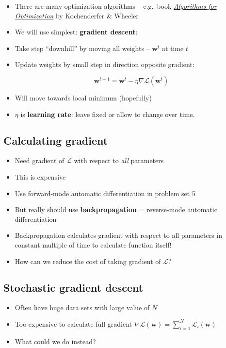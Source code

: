 \begin{itemize}
\item
  There are many optimization algorithms -- e.g.~book
  \href{https://mitpress.mit.edu/books/algorithms-optimization}{\emph{Algorithms
  for Optimization}} by Kochenderfer \& Wheeler
\item
  We will use simplest: \textbf{gradient descent}:
\item
  Take step ``downhill'' by moving all weights -- \(\mathbf{w}^t\) at
  time \(t\)
\item
  Update weights by small step in direction opposite gradient:

  \[\mathbf{w}^{t+1} = \mathbf{w}^{t} - \eta \nabla{\mathcal{L}}(\mathbf{w}^{t})\]
\item
  Will move towards local minimum (hopefully)
\item
  \(\eta\) is \textbf{learning rate}: leave fixed or allow to change
  over time.
\end{itemize}

\hypertarget{calculating-gradient}{%
\subsection{Calculating gradient}\label{calculating-gradient}}

\begin{itemize}
\item
  Need gradient of \(\mathcal{L}\) with respect to \emph{all} parameters
\item
  This is expensive
\item
  Use forward-mode automatic differentiation in problem set 5
\item
  But really should use \textbf{backpropagation} = reverse-mode
  automatic differentiation
\item
  Backpropagation calculates gradient with respect to all parameters in
  constant multiple of time to calculate function itself!
\item
  How can we reduce the cost of taking gradient of \(\mathcal{L}\)?
\end{itemize}

\hypertarget{stochastic-gradient-descent}{%
\subsection{Stochastic gradient
descent}\label{stochastic-gradient-descent}}

\begin{itemize}
\item
  Often have huge data sets with large value of \(N\)
\item
  Too expensive to calculate full gradient
  \(\nabla \mathcal{L}(\mathbf{w})= \sum_{i=1}^N \mathcal{L}_i(\mathbf{w})\)
\item
  What could we do instead?
\end{itemize}

